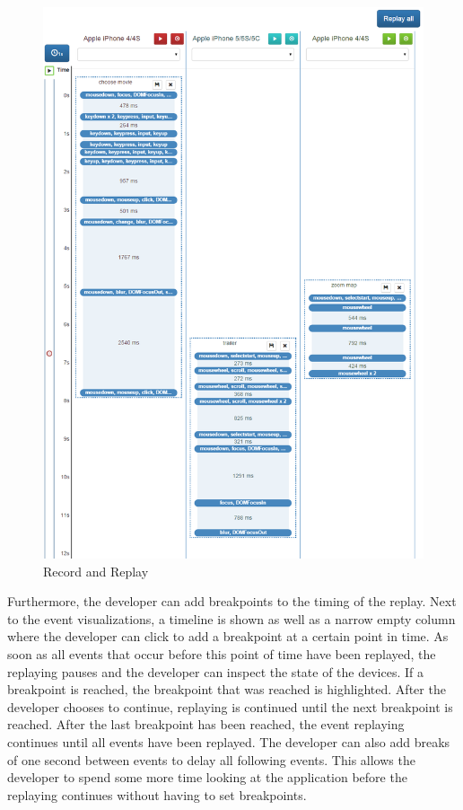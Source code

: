 \begin{figure}[H]
  \centering
    \includegraphics[width=1.0\textwidth]{images/screenshots/record_replay.png}
	\caption[Screenshot: Record and replay]{Record and Replay}
	\label{fig:record_replay}
\end{figure}

Furthermore, the developer can add breakpoints to the timing of the replay. Next to the event visualizations, a timeline is shown as well as a narrow empty column where the developer can click to add a breakpoint at a certain point in time. As soon as all events that occur before this point of time have been replayed, the replaying pauses and the developer can inspect the state of the devices. If a breakpoint is reached, the breakpoint that was reached is highlighted. After the developer chooses to continue, replaying is continued until the next breakpoint is reached. After the last breakpoint has been reached, the event replaying continues until all events have been replayed. The developer can also add breaks of one second between events to delay all following events. This allows the developer to spend some more time looking at the application before the replaying continues without having to set breakpoints. 